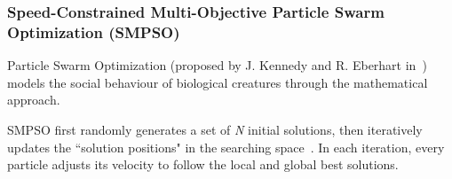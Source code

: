 \documentclass[10pt,journal,compsoc]{IEEEtran}
\begin{document}



\subsubsection{Speed-Constrained Multi-Objective Particle Swarm Optimization (SMPSO)}
Particle Swarm Optimization (proposed by J. Kennedy and R. Eberhart in~\cite{poli2017}) models the social behaviour of biological creatures through the mathematical approach.

SMPSO first randomly generates a set of \textit{N} initial solutions, then iteratively updates the ``solution positions" in the searching space~\cite{smpso}.
In each iteration, every particle adjusts its velocity to follow the local and global best solutions. 
\end{document}
